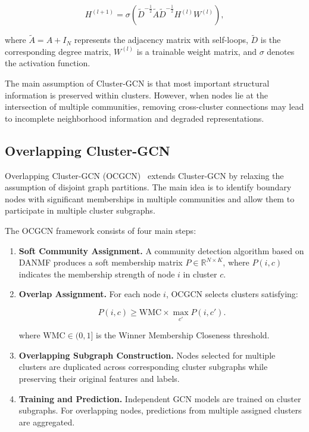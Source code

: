 \documentclass[a4paper,11pt,oneside,onecolumn,preprint]{elsarticle}
\numberwithin{equation}{section}
\begin{document}
\begin{equation}
H^{(l+1)}
=
\sigma
\left(
\tilde{D}^{-\frac{1}{2}}
\tilde{A}
\tilde{D}^{-\frac{1}{2}}
H^{(l)}
W^{(l)}
\right),
\label{eq:gcn-layer}
\end{equation}

where $\tilde{A}=A+I_N$ represents the adjacency matrix with self-loops, $\tilde{D}$ is the corresponding degree matrix, $W^{(l)}$ is a trainable weight matrix, and $\sigma$ denotes the activation function.

The main assumption of Cluster-GCN is that most important structural information is preserved within clusters.
However, when nodes lie at the intersection of multiple communities, removing cross-cluster connections may lead to incomplete neighborhood information and degraded representations.

\subsection{Overlapping Cluster-GCN}
\label{subsec:ocgcn}

Overlapping Cluster-GCN (OCGCN)~\cite{Amintoosi2021} extends Cluster-GCN by relaxing the assumption of disjoint graph partitions.
The main idea is to identify boundary nodes with significant memberships in multiple communities and allow them to participate in multiple cluster subgraphs.

The OCGCN framework consists of four main steps:

\begin{enumerate}

\item \textbf{Soft Community Assignment.}
A community detection algorithm based on DANMF produces a soft membership matrix
$P\in\mathbb{R}^{N\times K}$,
where $P(i,c)$ indicates the membership strength of node $i$ in cluster $c$.

\item \textbf{Overlap Assignment.}
For each node $i$, OCGCN selects clusters satisfying:

\begin{equation}
P(i,c)\geq \mathrm{WMC}\times\max_{c'}P(i,c').
\label{eq:wmc}
\end{equation}

where $\mathrm{WMC}\in(0,1]$ is the Winner Membership Closeness threshold.

\item \textbf{Overlapping Subgraph Construction.}
Nodes selected for multiple clusters are duplicated across corresponding cluster subgraphs while preserving their original features and labels.

\item \textbf{Training and Prediction.}
Independent GCN models are trained on cluster subgraphs.
For overlapping nodes, predictions from multiple assigned clusters are aggregated.

\end{enumerate}
\end{document}
